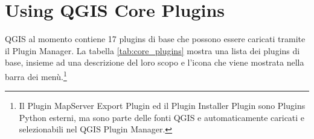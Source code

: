 
\section{Using QGIS Core Plugins}\label{sec:core_plugins}


QGIS al momento contiene 17 plugins di base che possono essere caricati tramite
il Plugin Manager.
La tabella \ref{tab:core_plugins} mostra una lista dei plugins di base, insieme
ad una descrizione del loro scopo e l'icona che viene mostrata nella barra dei
menù.\footnote{Il Plugin MapServer
Export Plugin ed il Plugin Installer Plugin sono Plugins Python esterni,
ma sono parte delle fonti QGIS e automaticamente caricati e selezionabili nel QGIS Plugin Manager.}

